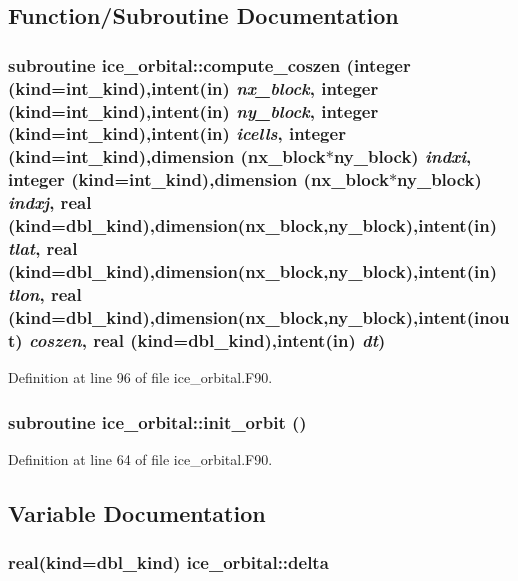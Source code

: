 \subsection{Function/Subroutine Documentation}
\hypertarget{namespaceice__orbital_a874f1fc41f0a366a196e53b9c8d13d85}{
\subsubsection[{compute\_\-coszen}]{\setlength{\rightskip}{0pt plus 5cm}subroutine ice\_\-orbital::compute\_\-coszen (integer (kind=int\_\-kind),intent(in) {\em nx\_\-block}, \/  integer (kind=int\_\-kind),intent(in) {\em ny\_\-block}, \/  integer (kind=int\_\-kind),intent(in) {\em icells}, \/  integer (kind=int\_\-kind),dimension (nx\_\-block$\ast$ny\_\-block) {\em indxi}, \/  integer (kind=int\_\-kind),dimension (nx\_\-block$\ast$ny\_\-block) {\em indxj}, \/  real (kind=dbl\_\-kind),dimension(nx\_\-block,ny\_\-block),intent(in) {\em tlat}, \/  real (kind=dbl\_\-kind),dimension(nx\_\-block,ny\_\-block),intent(in) {\em tlon}, \/  real (kind=dbl\_\-kind),dimension(nx\_\-block,ny\_\-block),intent(inout) {\em coszen}, \/  real (kind=dbl\_\-kind),intent(in) {\em dt})}}
\label{namespaceice__orbital_a874f1fc41f0a366a196e53b9c8d13d85}


Definition at line 96 of file ice\_\-orbital.F90.\hypertarget{namespaceice__orbital_a2bb0fda98ea9e34715f91802df7c8e9c}{
\subsubsection[{init\_\-orbit}]{\setlength{\rightskip}{0pt plus 5cm}subroutine ice\_\-orbital::init\_\-orbit ()}}
\label{namespaceice__orbital_a2bb0fda98ea9e34715f91802df7c8e9c}


Definition at line 64 of file ice\_\-orbital.F90.

\subsection{Variable Documentation}
\hypertarget{namespaceice__orbital_a2c094e1198e636bcaa1810e5730490a9}{
\subsubsection[{delta}]{\setlength{\rightskip}{0pt plus 5cm}real(kind=dbl\_\-kind) {\bf ice\_\-orbital::delta}}}
\label{namespaceice__orbital_a2c094e1198e636bcaa1810e5730490a9}


